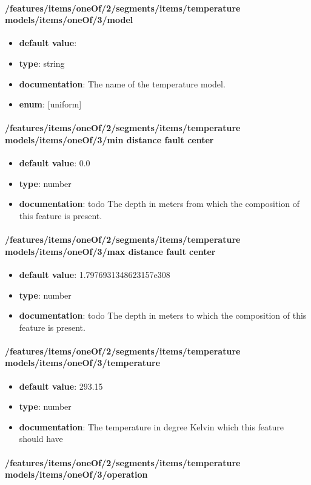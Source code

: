 \paragraph{/features/items/oneOf/2/segments/items/temperature models/items/oneOf/3/model}
\begin{itemize}\item {\bf default value}: 
\item {\bf type}: string
\item {\bf documentation}: The name of the temperature model.
\item {\bf enum}: [uniform]\end{itemize}\paragraph{/features/items/oneOf/2/segments/items/temperature models/items/oneOf/3/min distance fault center}
\begin{itemize}\item {\bf default value}: 0.0
\item {\bf type}: number
\item {\bf documentation}: todo The depth in meters from which the composition of this feature is present.
\end{itemize}\paragraph{/features/items/oneOf/2/segments/items/temperature models/items/oneOf/3/max distance fault center}
\begin{itemize}\item {\bf default value}: 1.7976931348623157e308
\item {\bf type}: number
\item {\bf documentation}: todo The depth in meters to which the composition of this feature is present.
\end{itemize}\paragraph{/features/items/oneOf/2/segments/items/temperature models/items/oneOf/3/temperature}
\begin{itemize}\item {\bf default value}: 293.15
\item {\bf type}: number
\item {\bf documentation}: The temperature in degree Kelvin which this feature should have
\end{itemize}\paragraph{/features/items/oneOf/2/segments/items/temperature models/items/oneOf/3/operation}
